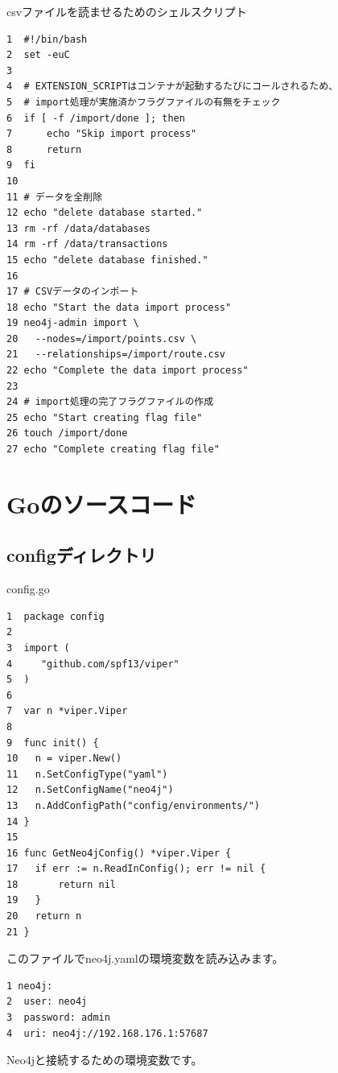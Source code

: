 csvファイルを読ませるためのシェルスクリプト
\begin{tcolorbox}[breakable]
\begin{verbatim}
1  #!/bin/bash
2  set -euC
3
4  # EXTENSION_SCRIPTはコンテナが起動するたびにコールされるため、
5  # import処理が実施済かフラグファイルの有無をチェック
6  if [ -f /import/done ]; then
7      echo "Skip import process"
8      return
9  fi
10
11 # データを全削除
12 echo "delete database started."
13 rm -rf /data/databases
14 rm -rf /data/transactions
15 echo "delete database finished."
16
17 # CSVデータのインポート
18 echo "Start the data import process"
19 neo4j-admin import \
20   --nodes=/import/points.csv \
21   --relationships=/import/route.csv
22 echo "Complete the data import process"
23
24 # import処理の完了フラグファイルの作成
25 echo "Start creating flag file"
26 touch /import/done
27 echo "Complete creating flag file"
\end{verbatim}
\end{tcolorbox}
    
\section{Goのソースコード}
\subsection{configディレクトリ}
config.go
\begin{tcolorbox}[breakable]
\begin{verbatim}
1  package config
2
3  import (
4  	  "github.com/spf13/viper"
5  )
6
7  var n *viper.Viper
8
9  func init() {
10 	 n = viper.New()
11	 n.SetConfigType("yaml")
12 	 n.SetConfigName("neo4j")
13 	 n.AddConfigPath("config/environments/")
14 }
15
16 func GetNeo4jConfig() *viper.Viper {
17	 if err := n.ReadInConfig(); err != nil {
18		 return nil
19	 }
20	 return n
21 }
\end{verbatim}
\end{tcolorbox}
このファイルでneo4j.yamlの環境変数を読み込みます。
\begin{tcolorbox}[breakable]
\begin{verbatim}
1 neo4j:
2  user: neo4j
3  password: admin
4  uri: neo4j://192.168.176.1:57687
\end{verbatim}
\end{tcolorbox}
Neo4jと接続するための環境変数です。
